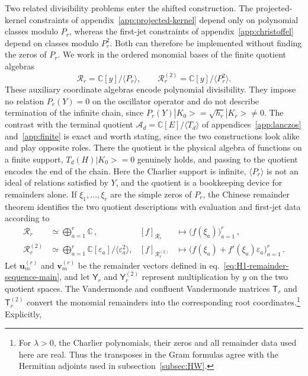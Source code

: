 \documentclass[a4paper,11pt]{article}
\def\ket#1{|#1>}%
\theoremstyle{definition}
\theoremstyle{remark}
\newcommand{\ket}[1]{|#1\rangle}
\newcommand{\CC}{\mathbb C}
\newcommand{\cA}{\mathcal A}
\begin{document}
Two related divisibility problems enter the shifted construction. The projected-kernel constraints of appendix~\ref{app:projected-kernel} depend only on polynomial classes modulo $P_r$, whereas the first-jet constraints of appendix~\ref{app:christoffel} depend on classes modulo $P_r^2$. Both can therefore be implemented without finding the zeros of $P_r$. We work in the ordered monomial bases of the finite quotient algebras
\begin{equation}
   \mathscr R_r=\CC[y]/\langle P_r\rangle,
   \qquad
   \mathscr R_r^{(2)}=\CC[y]/\langle P_r^2\rangle.
   \label{eq:H1-residue-jet-algebras-app}
\end{equation}
These auxiliary coordinate algebras encode polynomial divisibility. They impose no relation $P_r(Y)=0$ on the oscillator operator and do not describe termination of the infinite chain, since $P_r(Y)\ket{K_0}=\sqrt{h_r}\ket{K_r}\ne0$. The contrast with the terminal quotient $\cA_d=\CC[E]/\langle T_d\rangle$ of appendices~\ref{app:lanczos} and~\ref{app:finite} is exact and worth stating, since the two constructions look alike and play opposite roles. There the quotient is the physical algebra of functions on a finite support, $T_d(H)\ket{K_0}=0$ genuinely holds, and passing to the quotient encodes the end of the chain. Here the Charlier support is infinite, $\langle P_r\rangle$ is not an ideal of relations satisfied by $Y$, and the quotient is a bookkeeping device for remainders alone. If $\xi_1,\ldots,\xi_r$ are the simple zeros of $P_r$, the Chinese remainder theorem identifies the two quotient descriptions with evaluation and first-jet data according to
\begin{equation}
\begin{aligned}
   \mathscr R_r
   &\simeq\bigoplus_{a=1}^{r}\CC\,,
   &[f]_{\mathscr R_r}
   &\longmapsto\bigl(f(\xi_a)\bigr)_{a=1}^{r}\,,\\
   \mathscr R_r^{(2)}
   &\simeq\bigoplus_{a=1}^{r}\CC[\varepsilon_a]/\langle\varepsilon_a^2\rangle,
   &[f]_{\mathscr R_r^{(2)}}
   &\longmapsto
   \bigl(f(\xi_a)+f'(\xi_a)\varepsilon_a\bigr)_{a=1}^{r}\,.
\end{aligned}
   \label{eq:H1-Chinese-remainder-app}
\end{equation}
Let $\mathbf u_m^{(r)}$ and $\mathbf v_m^{(r)}$ be the remainder vectors defined in eq.~\eqref{eq:H1-remainder-sequence-main}, and let $\mathsf Y_r$ and $\mathsf Y_r^{(2)}$ represent multiplication by $y$ on the two quotient spaces. The Vandermonde and confluent Vandermonde matrices $\mathsf T_r$ and $\mathsf T_r^{(2)}$ convert the monomial remainders into the corresponding root coordinates.\footnote{For $\lambda>0$, the Charlier polynomials, their zeros and all remainder data used here are real. Thus the transposes in the Gram formulas agree with the Hermitian adjoints used in subsection~\ref{subsec:HW}.} Explicitly,
\end{document}
